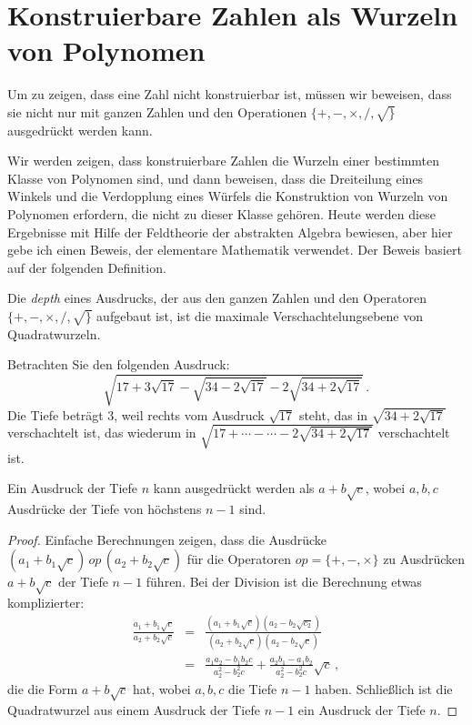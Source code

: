 \section{Konstruierbare Zahlen als Wurzeln von Polynomen}\label{s.trisect-poly}
Um zu zeigen, dass eine Zahl nicht konstruierbar ist, müssen wir beweisen, dass sie nicht nur mit ganzen Zahlen und den Operationen $\{+,-,\times,/,\surd\}$ ausgedrückt werden kann.

Wir werden zeigen, dass konstruierbare Zahlen die Wurzeln einer bestimmten Klasse von Polynomen sind, und dann beweisen, dass die Dreiteilung eines Winkels und die Verdopplung eines Würfels die Konstruktion von Wurzeln von Polynomen erfordern, die nicht zu dieser Klasse gehören. Heute werden diese Ergebnisse mit Hilfe der Feldtheorie der abstrakten Algebra bewiesen, aber hier gebe ich einen Beweis, der elementare Mathematik verwendet. Der Beweis basiert auf der folgenden Definition.

\begin{definition}
Die \emph{depth} eines Ausdrucks, der aus den ganzen Zahlen und den Operatoren $\{+,-,\times,/,\surd\}$ aufgebaut ist, ist die maximale Verschachtelungsebene von Quadratwurzeln.
\end{definition}

\begin{example}
Betrachten Sie den folgenden Ausdruck:
\[
\sqrt{17+3\sqrt{17} - \sqrt{34-2\sqrt{17}}
  -2\sqrt{34+2\sqrt{17}} }\,.
\]
Die Tiefe beträgt $3$, weil rechts vom Ausdruck $\sqrt{17}$ steht, das in $\sqrt{34+2\sqrt{17}}$ verschachtelt ist, das wiederum in
$\sqrt{17+\cdots-\cdots-2\sqrt{34+2\sqrt{17}}}$
verschachtelt ist.
\end{example}

\begin{theorem}
Ein Ausdruck der Tiefe $n$ kann ausgedrückt werden als $a+b\sqrt{c}$, wobei $a,b,c$ Ausdrücke der Tiefe von höchstens $n-1$ sind.
\end{theorem}
\begin{proof}
Einfache Berechnungen zeigen, dass die Ausdrücke $(a_1+b_1\sqrt{c})\,\mathit{op}\,(a_2+b_2\sqrt{c})$ für die Operatoren $\mathit{op}=\{+,-,\times\}$ zu Ausdrücken $a+b\sqrt{c}$ der Tiefe $n-1$ führen. Bei der Division ist die Berechnung etwas komplizierter:
\begin{eqnarray*}
\frac{a_1+b_1\sqrt{c}}{a_2+b_2\sqrt{c}}&=&
\frac{(a_1+b_1\sqrt{c})(a_2-b_2\sqrt{c_2})}{(a_2+b_2\sqrt{c})(a_2-b_2\sqrt{c})}\\
&=&\frac{a_1a_2-b_1b_2c}{a_2^2-b_2^2c}+\frac{a_2b_1-a_1b_2}{a_2^2-b_2^2c}\sqrt{c}\,,
\end{eqnarray*}
die die Form $a+b\sqrt{c}$ hat, wobei $a,b,c$ die Tiefe $n-1$ haben. Schließlich ist die Quadratwurzel aus einem Ausdruck der Tiefe $n-1$ ein Ausdruck der Tiefe $n$.
\end{proof}


